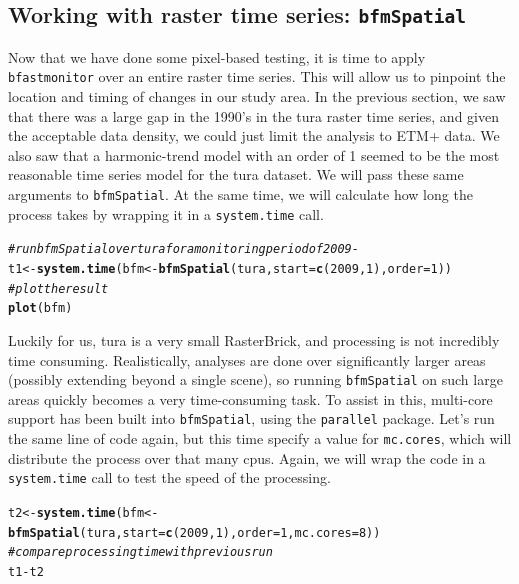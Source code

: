 \documentclass{article}\usepackage[]{graphicx}\usepackage[]{color}
\makeatletter
\newcommand{\hlnum}[1]{\textcolor[rgb]{0.686,0.059,0.569}{#1}}%
\newcommand{\hlcom}[1]{\textcolor[rgb]{0.678,0.584,0.686}{\textit{#1}}}%
\newcommand{\hlopt}[1]{\textcolor[rgb]{0,0,0}{#1}}%
\newcommand{\hlstd}[1]{\textcolor[rgb]{0.345,0.345,0.345}{#1}}%
\newcommand{\hlkwb}[1]{\textcolor[rgb]{0.69,0.353,0.396}{#1}}%
\newcommand{\hlkwc}[1]{\textcolor[rgb]{0.333,0.667,0.333}{#1}}%
\newcommand{\hlkwd}[1]{\textcolor[rgb]{0.737,0.353,0.396}{\textbf{#1}}}%
\newenvironment{kframe}{%
 \def\at@end@of@kframe{}%
 \ifinner\ifhmode%
  \def\at@end@of@kframe{\end{minipage}}%
  \begin{minipage}{\columnwidth}%
 \fi\fi%
 \def\FrameCommand##1{\hskip\@totalleftmargin \hskip-\fboxsep
 \colorbox{shadecolor}{##1}\hskip-\fboxsep
     \hskip-\linewidth \hskip-\@totalleftmargin \hskip\columnwidth}%
 \MakeFramed {\advance\hsize-\width
   \@totalleftmargin\z@ \linewidth\hsize
   \@setminipage}}%
 {\par\unskip\endMakeFramed%
 \at@end@of@kframe}
\newenvironment{knitrout}{}{} %
\def\code#1{\texttt{#1}}
\makeatother
\begin{document}
\subsection{Working with raster time series: \code{bfmSpatial}}

Now that we have done some pixel-based testing, it is time to apply \code{bfastmonitor} over an entire raster time series. This will allow us to pinpoint the location and timing of changes in our study area. In the previous section, we saw that there was a large gap in the 1990's in the tura raster time series, and given the acceptable data density, we could just limit the analysis to ETM+ data. We also saw that a harmonic-trend model with an order of 1 seemed to be the most reasonable time series model for the tura dataset. We will pass these same arguments to \code{bfmSpatial}. At the same time, we will calculate how long the process takes by wrapping it in a \code{system.time} call.




\begin{knitrout}
\color{fgcolor}\begin{kframe}
\begin{alltt}
\hlcom{# run bfmSpatial over tura for a monitoring period of 2009 -}
\hlstd{t1} \hlkwb{<-} \hlkwd{system.time}\hlstd{(bfm} \hlkwb{<-} \hlkwd{bfmSpatial}\hlstd{(tura,} \hlkwc{start} \hlstd{=} \hlkwd{c}\hlstd{(}\hlnum{2009}\hlstd{,} \hlnum{1}\hlstd{),} \hlkwc{order} \hlstd{=} \hlnum{1}\hlstd{))}
\hlcom{# plot the result}
\hlkwd{plot}\hlstd{(bfm)}
\end{alltt}
\end{kframe}
\end{knitrout}


Luckily for us, tura is a very small RasterBrick, and processing is not incredibly time consuming. Realistically, analyses are done over significantly larger areas (possibly extending beyond a single scene), so running \code{bfmSpatial} on such large areas quickly becomes a very time-consuming task. To assist in this, multi-core support has been built into \code{bfmSpatial}, using the \code{parallel} package. Let's run the same line of code again, but this time specify a value for \code{mc.cores}, which will distribute the process over that many cpus. Again, we will wrap the code in a \code{system.time} call to test the speed of the processing.

\begin{knitrout}
\color{fgcolor}\begin{kframe}
\begin{alltt}
\hlstd{t2} \hlkwb{<-} \hlkwd{system.time}\hlstd{(bfm} \hlkwb{<-} \hlkwd{bfmSpatial}\hlstd{(tura,} \hlkwc{start} \hlstd{=} \hlkwd{c}\hlstd{(}\hlnum{2009}\hlstd{,} \hlnum{1}\hlstd{),} \hlkwc{order} \hlstd{=} \hlnum{1}\hlstd{,} \hlkwc{mc.cores} \hlstd{=} \hlnum{8}\hlstd{))}
\hlcom{# compare processing time with previous run}
\hlstd{t1} \hlopt{-} \hlstd{t2}
\end{alltt}
\end{kframe}
\end{knitrout}
\end{document}
